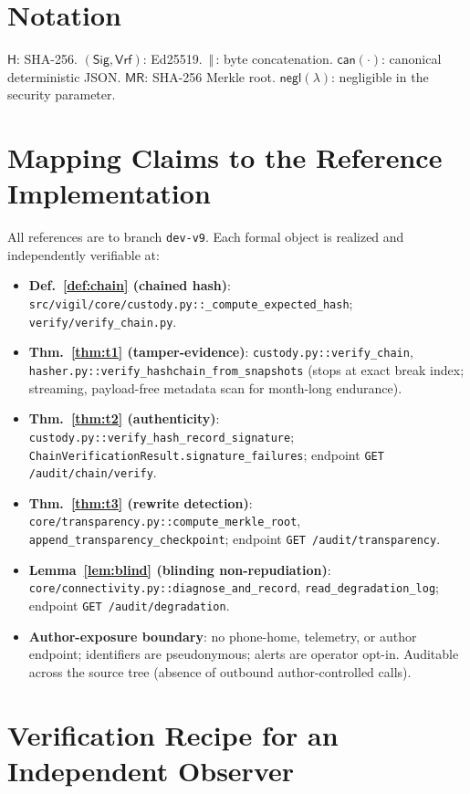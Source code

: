 \documentclass[11pt,a4paper]{article}
\theoremstyle{plain}
\theoremstyle{definition}
\theoremstyle{remark}
\newcommand{\negl}{\mathsf{negl}}
\newcommand{\Hash}{\mathsf{H}}
\newcommand{\Sign}{\mathsf{Sig}}
\newcommand{\Verify}{\mathsf{Vrf}}
\newcommand{\concat}{\,\Vert\,}
\newcommand{\code}[1]{\texttt{#1}}
\begin{document}
\appendix
\section{Notation}
$\Hash$: SHA-256. $(\Sign,\Verify)$: Ed25519.
$\concat$: byte concatenation. $\mathsf{can}(\cdot)$: canonical
deterministic JSON. $\mathsf{MR}$: SHA-256 Merkle root.
$\negl(\lambda)$: negligible in the security parameter.

\section{Mapping Claims to the Reference Implementation}
\label{app:map}

All references are to branch \code{dev-v9}. Each formal object is
realized and independently verifiable at:

\begin{itemize}[leftmargin=1.4em]
  \item \textbf{Def.~\ref{def:chain} (chained hash)}:
  \code{src/vigil/core/custody.py::\_compute\_expected\_hash};
  \code{verify/verify\_chain.py}.
  \item \textbf{Thm.~\ref{thm:t1} (tamper-evidence)}:
  \code{custody.py::verify\_chain},
  \code{hasher.py::verify\_hashchain\_from\_snapshots} (stops at exact
  break index; streaming, payload-free metadata scan for month-long
  endurance).
  \item \textbf{Thm.~\ref{thm:t2} (authenticity)}:
  \code{custody.py::verify\_hash\_record\_signature};
  \code{ChainVerificationResult.signature\_failures};
  endpoint \code{GET /audit/chain/verify}.
  \item \textbf{Thm.~\ref{thm:t3} (rewrite detection)}:
  \code{core/transparency.py::compute\_merkle\_root},
  \code{append\_transparency\_checkpoint};
  endpoint \code{GET /audit/transparency}.
  \item \textbf{Lemma~\ref{lem:blind} (blinding non-repudiation)}:
  \code{core/connectivity.py::diagnose\_and\_record},
  \code{read\_degradation\_log}; endpoint \code{GET /audit/degradation}.
  \item \textbf{Author-exposure boundary}: no phone-home, telemetry, or
  author endpoint; identifiers are pseudonymous; alerts are operator
  opt-in. Auditable across the source tree (absence of outbound
  author-controlled calls).
\end{itemize}

\section{Verification Recipe for an Independent Observer}
\end{document}
